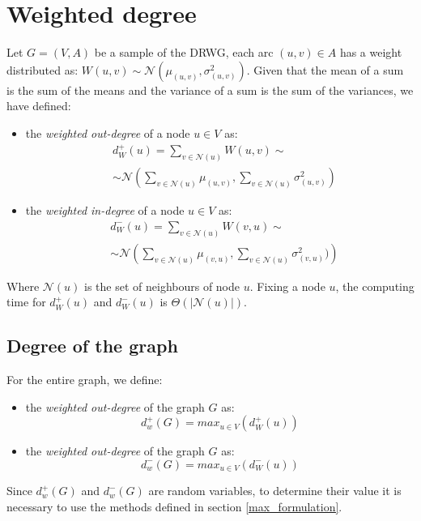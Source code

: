 \section{Weighted degree}
Let \( G = (V, A) \) be a sample of the DRWG, each arc \( (u, v) \in A \) has a weight distributed as: $W(u, v) \sim \mathcal{N}(\mu_{(u, v)}, \sigma^2_{(u, v)})$.
Given that the mean of a sum is the sum of the means and the variance of a sum is the sum of the variances, we have defined:
\begin{itemize}
	\item the \textit{weighted out-degree} of a node $u\in V$ as:
	\begin{align*}
		&d_W^+(u) = \sum_{v \in \mathcal{N}(u)} W(u, v) \sim \\
		&\sim \mathcal{N} \left( \sum_{v \in \mathcal{N}(u)} \mu_{(u, v)}, \sum_{v \in \mathcal{N}(u)} \sigma^2_{(u, v)}\right)
	\end{align*}
	\item the \textit{weighted in-degree} of a node $u\in V$ as:
	\begin{align*}
		&d_W^-(u) = \sum_{v \in \mathcal{N}(u)} W(v, u) \sim \\
		&\sim \mathcal{N}\left(\sum_{v \in \mathcal{N}(u)} \mu_{(v, u)}, \sum_{v \in \mathcal{N}(u)} \sigma^2_{(v, u)})\right)
	\end{align*}
\end{itemize}

Where $\mathcal{N}(u)$ is the set of neighbours of node $u$.
Fixing a node $u$, the computing time for $d_W^+(u)$ and $d_W^-(u)$ is $\Theta(|\mathcal{N}(u)|)$.

\subsection{Degree of the graph}
For the entire graph, we define:
\begin{itemize}
	\item the \textit{weighted out-degree} of the graph $G$ as:
	$$d^+_w(G) = max_{u\in V}(d_W^+(u))$$
	\item the \textit{weighted out-degree} of the graph $G$ as:
	$$d^-_w(G) = max_{u\in V}(d_W^-(u))$$
\end{itemize}
Since $d^+_w(G)$ and $d^-_w(G)$ are random variables, to determine their value it is necessary to use the methods defined in section \ref{max_formulation}.